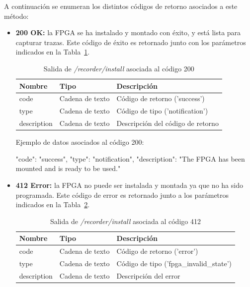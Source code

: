 A continuación se enumeran los distintos códigos de retorno asociados a este método:
\begin{itemize}

\item{\textbf{200 OK:} la \gls{FPGA} se ha instalado y montado con éxito, y está lista para capturar \glspl{traza}.
Este código de éxito es retornado junto con los parámetros indicados en la Tabla~\ref{extra:api:recorderinstall:ok}.
\begin{table}[H]
\centering
\begin{tabular}{|l|l|l|}
\hline
\rowcolor[HTML]{F5F5F5}
\textbf{Nombre}  & \textbf{Tipo}   & \textbf{Descripción}              \\ \hline
code             & Cadena de texto & Código de retorno ('success')     \\ \hline
type             & Cadena de texto & Código de tipo ('notification')   \\ \hline
description      & Cadena de texto & Descripción del código de retorno \\ \hline
\end{tabular}
\caption{Salida de \textit{/recorder/install} asociada al código 200}
\label{extra:api:recorderinstall:ok}
\end{table}
\begin{minipage}{\textwidth}
Ejemplo de datos asociados al código 200:

\begin{code}[language=json]
{
  "code": "success",
  "type": "notification",
  "description": "The FPGA has been mounted and is ready to be used."
}
\end{code}
\end{minipage}
}

\item{\textbf{412 Error:} la \gls{FPGA} no puede ser instalada y montada ya que no ha sido programada.
Este código de error es retornado junto a los parámetros indicados en la Tabla~\ref{extra:api:recorderinstall:error}.
\begin{table}[H]
\centering
\begin{tabular}{|l|l|l|}
\hline
\rowcolor[HTML]{F5F5F5}
\textbf{Nombre}  & \textbf{Tipo}   & \textbf{Descripción}                    \\ \hline
code             & Cadena de texto & Código de retorno ('error')             \\ \hline
type             & Cadena de texto & Código de tipo ('fpga\_invalid\_state') \\ \hline
description      & Cadena de texto & Descripción del error                   \\ \hline
\end{tabular}
\caption{Salida de \textit{/recorder/install} asociada al código 412}
\label{extra:api:recorderinstall:error}
\end{table}

}
\end{itemize}
